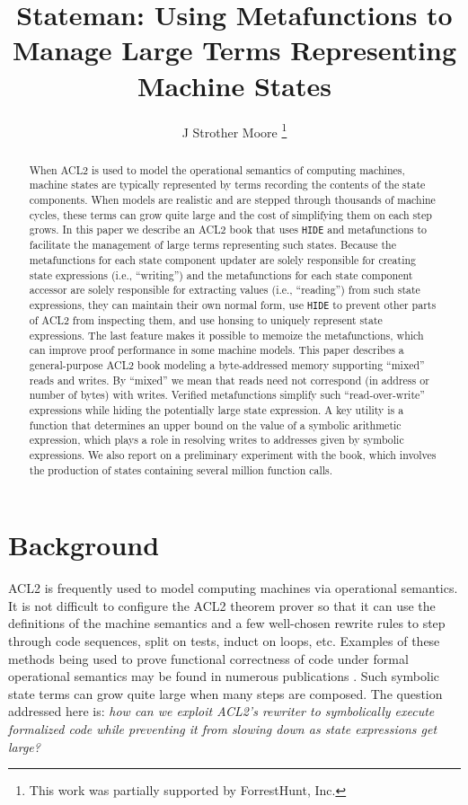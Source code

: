 \documentclass[submission,copyright,creativecommons]{eptcs}
\title{Stateman:  Using Metafunctions to Manage Large Terms Representing Machine States}
\author{J Strother Moore
\institute{Department of Computer Science\\
The University of Texas at Austin}
\email{moore@cs.utexas.edu}
\thanks{This work was partially supported by ForrestHunt, Inc.}
}
\newcommand{\ptt}[1]{\tt{#1}}
\begin{document}
\maketitle

\begin{abstract}

When ACL2 is used to model the operational semantics of computing machines,
machine states are typically represented by terms recording the contents of
the state components.  When models are realistic and are stepped through
thousands of machine cycles, these terms can grow quite large and the cost of
simplifying them on each step grows.  In this paper we describe an ACL2 book
that uses {\ptt{HIDE}} and metafunctions to facilitate the management of
large terms representing such states.  Because the metafunctions for each
state component updater are solely responsible for creating state expressions
(i.e., ``writing'') and the metafunctions for each state component accessor
are solely responsible for extracting values (i.e., ``reading'') from such
state expressions, they can maintain their own normal form, use {\ptt{HIDE}}
to prevent other parts of ACL2 from inspecting them, and use honsing to
uniquely represent state expressions.  The last feature makes it possible to
memoize the metafunctions, which can improve proof performance in some
machine models.  This paper describes a general-purpose ACL2 book modeling a
byte-addressed memory supporting ``mixed'' reads and writes.  By ``mixed'' we
mean that reads need not correspond (in address or number of bytes) with
writes.  Verified metafunctions simplify such ``read-over-write'' expressions
while hiding the potentially large state expression.  A key utility is a
function that determines an upper bound on the value of a symbolic arithmetic
expression, which plays a role in resolving writes to addresses
given by symbolic expressions.  We also report on a preliminary experiment
with the book, which involves the production of states containing several
million function calls.



\end{abstract}

\section{Background}

ACL2 \cite{car,acs} is frequently used to model computing machines via
operational semantics.  It is not difficult to configure the ACL2 theorem
prover so that it can use the definitions of the machine semantics and a few
well-chosen rewrite rules to step through code sequences, split on tests,
induct on loops, etc.  Examples of these methods being used to prove
functional correctness of code under formal operational semantics may be
found in numerous publications
\cite{Liu-04,Moore-Martinez09,Toibazarov,fmcad14}.  Such symbolic state terms
can grow quite large when many steps are composed.  The question addressed
here is: {\em{how can we exploit ACL2's rewriter to symbolically execute
    formalized code while preventing it from slowing down as state
    expressions get large?}}
\end{document}
